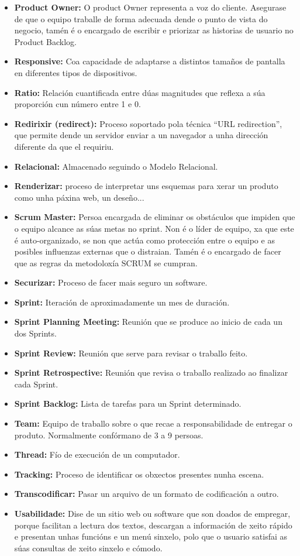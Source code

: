 \begin{itemize}
    \item \textbf{Product Owner:} O product Owner representa a voz do cliente. Asegurase de que o equipo 
        traballe de forma adecuada dende o punto de vista do negocio, tamén é o encargado de 
        escribir e priorizar as historias de usuario no Product Backlog.
    \item \textbf{Responsive:} Coa capacidade de adaptarse a distintos tamaños de pantalla en diferentes 
        tipos de dispositivos.
    \item \textbf{Ratio:} Relación cuantificada entre dúas magnitudes que reflexa a súa proporción cun número
        entre 1 e 0.
    \item \textbf{Redirixir (redirect):} Proceso soportado pola técnica ``URL redirection'', que permite 
    dende un servidor enviar a un navegador a unha dirección diferente da que el requiriu.  
    \item \textbf{Relacional:} Almacenado seguindo o Modelo Relacional.
    \item \textbf{Renderizar:} proceso de interpretar uns esquemas para xerar un produto como unha páxina
        web, un deseño...
	\item \textbf{Scrum Master:} Persoa encargada de eliminar os obstáculos que impiden que o equipo alcance
        as súas metas no sprint. Non é o líder de equipo, xa que este é auto-organizado, se non que 
        actúa como protección entre o equipo e as posibles influenzas externas que o distraian. Tamén
        é o encargado de facer que as regras da metodoloxía SCRUM se cumpran.
    \item \textbf{Securizar:} Proceso de facer mais seguro un software. 
	\item \textbf{Sprint:} Iteración de aproximadamente un mes de duración. 
	\item \textbf{Sprint Planning Meeting:} Reunión que se produce ao inicio de cada un dos Sprints.	
	\item \textbf{Sprint Review:} Reunión que serve para revisar o traballo feito.
	\item \textbf{Sprint Retrospective:} Reunión que revisa o traballo realizado ao finalizar cada Sprint.
	\item \textbf{Sprint Backlog:} Lista de tarefas para un Sprint determinado.
    \item \textbf{Team:} Equipo de traballo sobre o que recae a responsabilidade de entregar o 
        produto. Normalmente confórmano de 3 a 9 persoas.
    \item \textbf{Thread:} Fío de execución de un computador.
    \item \textbf{Tracking:} Proceso de identificar os obxectos presentes nunha escena.
    \item \textbf{Transcodificar:} Pasar un arquivo de un formato de codificación a outro.
    \item \textbf{Usabilidade:} Dise de un sitio web ou software que son doados de empregar, porque facilitan 
        a lectura dos textos, descargan a información de xeito rápido e presentan unhas funcións e
        un menú sinxelo, polo que o usuario satisfai as súas consultas de xeito sinxelo e cómodo.
	
\end{itemize}
